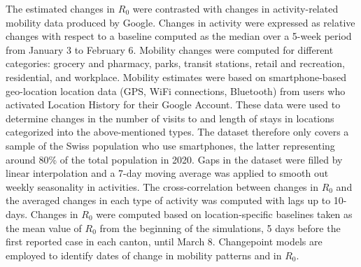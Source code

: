 The estimated changes in $R_0$  were contrasted with changes in activity-related mobility data produced by Google\cite{GoogleLLC:GoogleCOVID19Community:2020}. Changes in activity were expressed as relative changes with respect to a baseline computed as the median over a 5-week period from January 3 to February 6. Mobility changes were computed for different categories: grocery and pharmacy, parks, transit stations, retail and recreation, residential, and workplace. Mobility estimates were based on smartphone-based geo-location location data (GPS, WiFi connections, Bluetooth) from users who activated Location History for their Google Account. These data were used to determine changes in the number of visits to and length of stays in locations categorized into the above-mentioned types. The dataset therefore only covers a sample of the Swiss population who use smartphones, the latter representing around 80\% of the total population in 2020\cite{ODea:SmartphoneUsersSwitzerland:2020}. Gaps in the dataset were filled by linear interpolation and a 7-day moving average was applied to smooth out weekly seasonality in activities. The cross-correlation between changes in $R_0$ and the averaged changes in each type of activity was computed with lags up to 10-days. Changes in $R_0$ were computed based on location-specific baselines taken as the mean value of $R_0$ from the beginning of the simulations, 5 days before the first reported case in each canton, until March 8. Changepoint models are employed to identify dates of change in mobility patterns and in $R_0$. 


